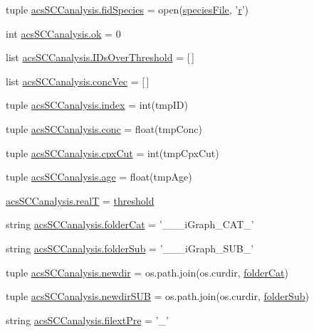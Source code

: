 \begin{DoxyCompactItemize}
\item 
tuple \hyperlink{a00096_aba2f982879776e057b35971b3653549e}{acs\-S\-C\-Canalysis.\-fid\-Species} = open(\hyperlink{a00021_a7da0c82834970c5f3c3d9224ab832577}{species\-File}, '\hyperlink{a00025_ac862e7284527eb913b1351c8bfb8e079}{r}')
\item 
int \hyperlink{a00096_a9ce833d782f17d858941cfa76914599a}{acs\-S\-C\-Canalysis.\-ok} = 0
\item 
list \hyperlink{a00096_a578f0f0f1e87579d73b11f8720610b1e}{acs\-S\-C\-Canalysis.\-I\-Ds\-Over\-Threshold} = \mbox{[}$\,$\mbox{]}
\item 
list \hyperlink{a00096_a1681853ab5f5859e51f219caa07a8539}{acs\-S\-C\-Canalysis.\-conc\-Vec} = \mbox{[}$\,$\mbox{]}
\item 
tuple \hyperlink{a00096_aaac3bb67a998c4a09aeed8f1adec2f9c}{acs\-S\-C\-Canalysis.\-index} = int(tmp\-I\-D)
\item 
tuple \hyperlink{a00096_a6ec435b19c74f79f32a0eae7bb2bd1c8}{acs\-S\-C\-Canalysis.\-conc} = float(tmp\-Conc)
\item 
tuple \hyperlink{a00096_a06673ec4592e44a89a443073b8a29011}{acs\-S\-C\-Canalysis.\-cpx\-Cut} = int(tmp\-Cpx\-Cut)
\item 
tuple \hyperlink{a00096_a98baad82b74a27e8b8c58aa985b7d374}{acs\-S\-C\-Canalysis.\-age} = float(tmp\-Age)
\item 
\hyperlink{a00096_a1c9b45f6074222ace96b7ab38cb8e23b}{acs\-S\-C\-Canalysis.\-real\-T} = \hyperlink{a00030_aa022cbb28f80299d572def08e7a5ccfd}{threshold}
\item 
string \hyperlink{a00096_a1cbfd083273176eebfe0260e8384acef}{acs\-S\-C\-Canalysis.\-folder\-Cat} = '\-\_\-\-\_\-\_\-i\-Graph\-\_\-\-C\-A\-T\-\_\-'
\item 
string \hyperlink{a00096_a90c2bcabbdb271c2c3347ebea4c259bc}{acs\-S\-C\-Canalysis.\-folder\-Sub} = '\-\_\-\-\_\-\_\-i\-Graph\-\_\-\-S\-U\-B\-\_\-'
\item 
tuple \hyperlink{a00096_a440179ca1c764cabcf9181985ae5dfb8}{acs\-S\-C\-Canalysis.\-newdir} = os.\-path.\-join(os.\-curdir, \hyperlink{a00022_ac4793cb55101110d228ded89ce9caa48}{folder\-Cat})
\item 
tuple \hyperlink{a00096_adb3b62d0896774bc87adfee19d047aa8}{acs\-S\-C\-Canalysis.\-newdir\-S\-U\-B} = os.\-path.\-join(os.\-curdir, \hyperlink{a00022_a05c5bf0305e5d58d4dc25bd89a025678}{folder\-Sub})
\item 
string \hyperlink{a00096_a60ff937c050eef601bd84134d1913d8a}{acs\-S\-C\-Canalysis.\-filext\-Pre} = '\-\_\-'
\item 

\end{DoxyCompactItemize}
